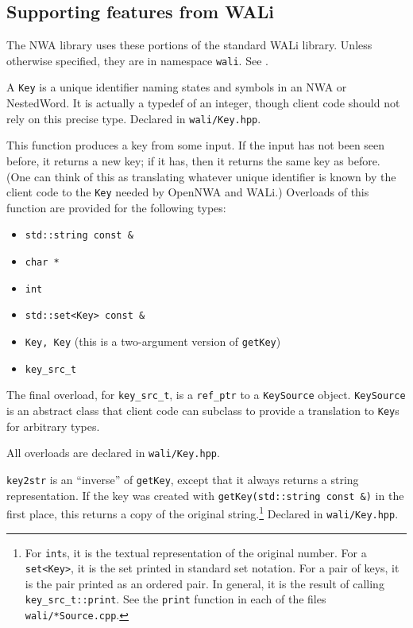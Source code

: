 \subsection{Supporting features from WALi}

The NWA library uses these portions of the standard WALi library. Unless
otherwise specified, they are in namespace \texttt{wali}. See \cite{wali}.

\begin{functionlist}
   A \texttt{Key} is a unique identifier naming states and symbols in an
    NWA or NestedWord. It is actually a typedef of an integer, though client
    code should not rely on this precise type. Declared in
    \texttt{wali/Key.hpp}.

   This function produces a key from some input. If
    the input has not been seen before, it returns a new key; if it has, then
    it returns the same key as before. (One can think of this as translating
    whatever unique identifier is known by the client code to the
    \texttt{Key} needed by OpenNWA and WALi.) Overloads of this function are provided for
    the following types:
    \begin{itemize}
      \item \texttt{std::string const \&}
      \item \texttt{char *}
      \item \texttt{int}
      \item \texttt{std::set<Key> const \&}
      \item \texttt{Key, Key} (this is a two-argument version of
        \texttt{getKey})
      \item \texttt{key\_src\_t}
    \end{itemize}
    The final overload, for \texttt{key\_src\_t}, is a \texttt{ref\_ptr} to a
    \texttt{KeySource} object. \texttt{KeySource} is an abstract class that
    client code can subclass to provide a translation to \texttt{Key}s for
    arbitrary types.

    All overloads are declared in \texttt{wali/Key.hpp}.

    \texttt{key2str} is an ``inverse'' of \texttt{getKey}, except that it
    always returns a string representation. If the key was created with
    \texttt{getKey(std::string const \&)} in the first place, this
    returns a copy of the original string.\footnote{For \texttt{int}s, it is the
    textual representation of the original number. For a \texttt{set<Key>},
    it is the set printed in standard set notation. For a pair of keys, it is
    the pair printed as an ordered pair. In general, it is the result of
    calling \texttt{key\_src\_t::print}. See the \texttt{print} function in
    each of the files \texttt{wali/*Source.cpp}.} Declared in
    \texttt{wali/Key.hpp}.


\end{functionlist}
